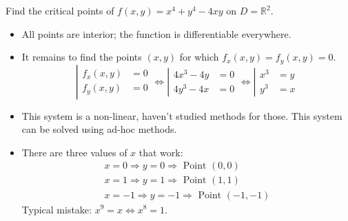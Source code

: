 \begin{frame}
\begin{example}
Find the critical points of $f(x,y) = x^4+y^4-4xy$ on $D=\mathbb{R}^2$.
\begin{itemize}
\item \pause All points are interior; \pause the function is differentiable everywhere.
\item \pause It remains to find the points $(x,y)$ for which $f_x(x,y)=f_y(x,y)=0$.
\[
\left| 
\begin{array}{ll}
f_x(x,y) & = 0 \\
f_y(x,y) & = 0
\end{array}
\right.
\Longleftrightarrow
\left| \begin{array}{ll}
4x^3-4y & = 0 \\
4y^3-4x & = 0
\end{array}
\right.
\Longleftrightarrow
\left| \begin{array}{ll}
x^3 & = y \\
y^3 & = x
\end{array}
\right. \]
\item \pause This system is a non-linear, haven't studied methods for those. \pause This system can be solved using ad-hoc methods.\pause
\item 
There are three values of $x$ that work:
\begin{align*}
x=0 \Longrightarrow y=0 \Longrightarrow \text{ Point } (0,0)\\
x=1 \Longrightarrow y=1 \Longrightarrow \text{ Point } (1,1) \\
x=-1 \Longrightarrow y=-1 \Longrightarrow \text{ Point } (-1,-1)
\end{align*}
\pause Typical mistake: \pause $x^9 = x \Longleftrightarrow x^8=1$.
\end{itemize}
\end{example}
\end{frame}
